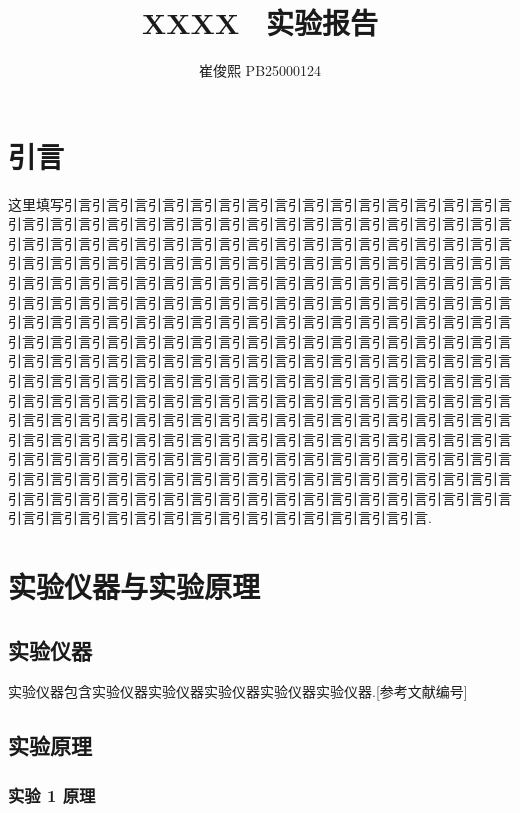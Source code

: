 \documentclass[9pt,a4paper,twoside]{../rho-class/rho}
\title{XXXX \  实验报告}
\author{崔俊熙 PB25000124}
\begin{document}
\maketitle
\thispagestyle{firststyle}


\section{引言}
这里填写引言引言引言引言引言引言引言引言引言引言引言引言引言引言引言引言引言引言引言引言引言引言引言引言引言引言引言引言引言引言引言引言引言引言引言引言引言引言引言引言引言引言引言引言引言引言引言引言引言引言引言引言引言引言引言引言引言引言引言引言引言引言引言引言引言引言引言引言引言引言引言引言引言引言引言引言引言引言引言引言引言引言引言引言引言引言引言引言引言引言引言引言引言引言引言引言引言引言引言引言引言引言引言引言引言引言引言引言引言引言引言引言引言引言引言引言引言引言引言引言引言引言引言引言引言引言引言引言引言引言引言引言引言引言引言引言引言引言引言引言引言引言引言引言引言引言引言引言引言引言引言引言引言引言引言引言引言引言引言引言引言引言引言引言引言引言引言引言引言引言引言引言引言引言引言引言引言引言引言引言引言引言引言引言引言引言引言引言引言引言引言引言引言引言引言引言引言引言引言引言引言引言引言引言引言引言引言引言引言引言引言引言引言引言引言引言引言引言引言引言引言引言引言引言引言引言引言引言引言引言引言引言引言引言引言引言引言引言引言引言引言引言引言引言引言引言引言引言引言引言引言引言引言引言引言引言引言引言引言引言引言引言引言引言引言引言引言引言引言引言引言引言引言引言引言引言引言引言引言引言引言引言引言引言引言引言引言引言引言引言引言引言引言引言引言引言引言引言引言引言引言.


\section{实验仪器与实验原理}

\subsection{实验仪器}

实验仪器包含实验仪器实验仪器实验仪器实验仪器实验仪器.[参考文献编号]

\subsection{实验原理}

\subsubsection{实验 1 原理}
\end{document}
